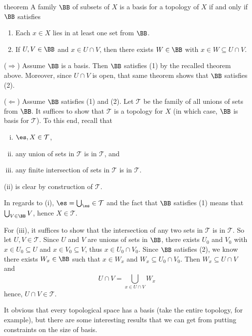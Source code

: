 \documentclass[class=article, crop=false]{standalone}
\begin{document}
\begin{result}{theorem}
  A family $\BB$ of subsets of $X$ is a basis for a topology of $X$ if and only if $\BB$ satisfies
    \begin{enumerate}[(1)]
      \item Each $x \in X$ lies in at least one set from $\BB$.
      \item If $U,V \in \BB$ and $x \in U \cap V$, then there exists $W \in \BB$ with $x \in W \subseteq U \cap V$.
    \end{enumerate}
\end{result}
\begin{pf}
  ($\Rightarrow$) Assume $\BB$ is a basis. Then $\BB$ satisfies (1) by the recalled theorem above. Moreover, since $U \cap V$ is open, that same theorem shows that $\BB$ satisfies (2).

  ($\Leftarrow$) Assume $\BB$ satisfies (1) and (2). Let $\mathcal T$ be the family of all unions of sets from $\BB$. It suffices to show that $\mathcal T$ is a topology for $X$ (in which case, $\BB$ is basis for $\mathcal T$). To this end, recall that
  \begin{enumerate}[(i)]
    \item $\es, X \in \mathcal T$,
    \item any union of sets in $\mathcal T$ is in $\mathcal T$, and
    \item any finite intersection of sets in $\mathcal T$ is in $\mathcal T$.
  \end{enumerate}
  \noindent (ii) is clear by construction of $\mathcal T$.

  In regards to (i), $\es = \bigcup_{\es}^{} \in \mathcal T$ and the fact that $\BB$ satisfies (1) means that $\bigcup_{V \in \BB}^{} V$, hence $X \in \mathcal T$.

  For (iii), it suffices to show that the intersection of any two sets in $\mathcal T$ is in $\mathcal T$. So let $U,V \in \mathcal T$. Since $U$ and $V$ are unions of sets in $\BB$, there exists $U_0$ and $V_0$ with $x \in U_0 \subseteq U$ and $x \in V_0 \subseteq V$, thus $x \in U_0 \cap V_0$. Since $\BB$ satisfies (2), we know there exists $W_x \in \BB$
  such that $x \in W_x$ and $W_x \subseteq U_0 \cap V_0$. Then $W_x \subseteq U \cap V$ and
    \[
      U \cap V = \bigcup_{x \in U \cap V}^{} W_x
    \]
  hence, $U \cap V \in \mathcal T$.
\end{pf}

It obvious that every topological space has a basis (take the entire topology, for example), but there are some interesting results that we can get from putting constraints on the size of basis.
\end{document}
